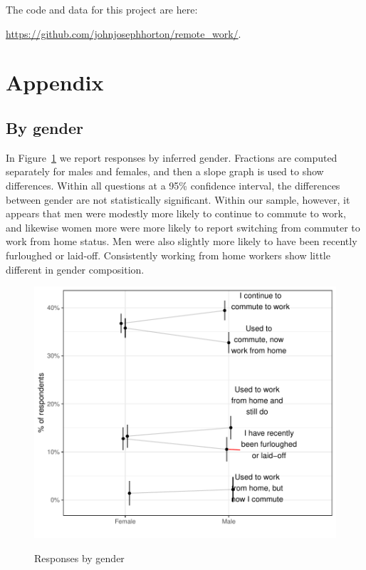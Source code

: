 \documentclass[12pt]{article}
\begin{document}
The code and data for this project are here:

\href{https://github.com/johnjosephhorton/remote\_work/}{https://github.com/johnjosephhorton/remote\_work/}.

\newpage \clearpage




\appendix

\section{Appendix} 
\subsection{By gender} \label{sec:gender}

In Figure~\ref{fig:gender} we report responses by inferred gender.
Fractions are computed separately for males and females, and then a slope graph is used to show differences. Within all questions at a 95\% confidence interval, the differences between gender are not statistically significant. Within our sample, however, it appears that men were modestly more likely to continue to commute to work, and likewise women more were more likely to report switching from commuter to work from home status. Men were also slightly more likely to have been recently furloughed or laid-off. Consistently working from home workers show little different in gender composition.

\begin{figure}
  \caption{Responses by gender} \label{fig:gender}
\centering
\begin{minipage}{1.0 \linewidth}
  \includegraphics[width = \linewidth]{plots/gender.pdf} \\
  \begin{footnotesize}
    \begin{singlespace}
    \end{singlespace}
    \end{footnotesize}
\end{minipage}
\end{figure} 
\end{document}
